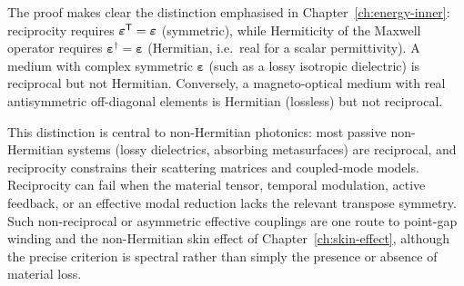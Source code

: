 The proof makes clear the distinction emphasised in
Chapter~\ref{ch:energy-inner}: reciprocity requires
$\boldsymbol{\varepsilon}^{\mathsf{T}} = \boldsymbol{\varepsilon}$
(symmetric), while Hermiticity of the Maxwell operator requires
$\boldsymbol{\varepsilon}^\dagger = \boldsymbol{\varepsilon}$
(Hermitian, i.e.\ real for a scalar permittivity). A medium with
complex symmetric $\boldsymbol{\varepsilon}$ (such as a lossy isotropic
dielectric) is reciprocal but not Hermitian. Conversely, a
magneto-optical medium with real antisymmetric off-diagonal elements is
Hermitian (lossless) but not reciprocal.

This distinction is central to non-Hermitian photonics: most passive
non-Hermitian systems (lossy dielectrics, absorbing metasurfaces) are
reciprocal, and reciprocity constrains their scattering matrices and
coupled-mode models. Reciprocity can fail when the material tensor,
temporal modulation, active feedback, or an effective modal reduction
lacks the relevant transpose symmetry. Such non-reciprocal or
asymmetric effective couplings are one route to point-gap winding and
the non-Hermitian skin effect of Chapter~\ref{ch:skin-effect}, although
the precise criterion is spectral rather than simply the presence or
absence of material loss.
